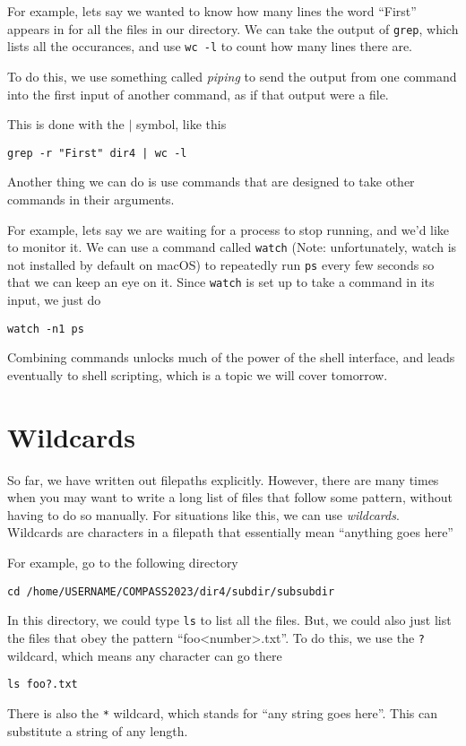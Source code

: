 \documentclass[aps,showpacs,prd,notitlepage,preprintnumbers,amsmath,amssymb,letterpaper]{revtex4}
\begin{document}
For example, lets say we wanted to know how many lines the word ``First'' appears in for all the files in our directory.
We can take the output of \verb|grep|, which lists all the occurances, and use \verb|wc -l| to count how many lines there are.

To do this, we use something called \textit{piping} to send the output from one command into the first input of another command, as if that output were a file.

This is done with the $|$ symbol, like this
\begin{verbatim}
grep -r "First" dir4 | wc -l
\end{verbatim}

Another thing we can do is use commands that are designed to take other commands in their arguments.

For example, lets say we are waiting for a process to stop running, and we'd like to monitor it.
We can use a command called \verb|watch| (Note: unfortunately, watch is not installed by default on macOS) to repeatedly run \verb|ps| every few seconds so that we can keep an eye on it.
Since \verb|watch| is set up to take a command in its input, we just do
\begin{verbatim}
watch -n1 ps
\end{verbatim}

Combining commands unlocks much of the power of the shell interface, and leads eventually to shell scripting, which is a topic we will cover tomorrow.

\section{Wildcards}
So far, we have written out filepaths explicitly. However, there are many times when you may want to write a long list of files that follow some pattern, without having to do so manually.
For situations like this, we can use \textit{wildcards}. Wildcards are characters in a filepath that essentially mean ``anything goes here''

For example, go to the following directory
\begin{verbatim}
cd /home/USERNAME/COMPASS2023/dir4/subdir/subsubdir
\end{verbatim}
In this directory, we could type \verb|ls| to list all the files.
But, we could also just list the files that obey the pattern ``foo<number>.txt''.
To do this, we use the \verb|?| wildcard, which means any character can go there

\begin{verbatim}
ls foo?.txt
\end{verbatim}
There is also the \verb|*| wildcard, which stands for ``any string goes here''.
This can substitute a string of any length.
\end{document}
